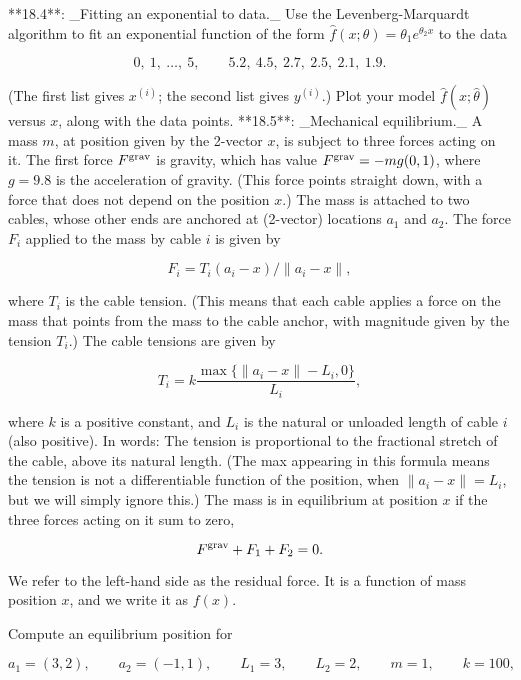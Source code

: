 

**18.4**: _Fitting an exponential to data._ Use the Levenberg-Marquardt algorithm to fit an exponential function of the form \(\hat{f}(x;\theta)=\theta_{1}e^{\theta_{2}x}\) to the data

\[0,\ 1,\ \ldots,\ 5,\qquad 5.2,\ 4.5,\ 2.7,\ 2.5,\ 2.1,\ 1.9.\]

(The first list gives \(x^{(i)}\); the second list gives \(y^{(i)}\).) Plot your model \(\hat{f}(x;\hat{\theta})\) versus \(x\), along with the data points.
**18.5**: _Mechanical equilibrium._ A mass \(m\), at position given by the 2-vector \(x\), is subject to three forces acting on it. The first force \(F^{\rm grav}\) is gravity, which has value \(F^{\rm grav}=-mg(0,1)\), where \(g=9.8\) is the acceleration of gravity. (This force points straight down, with a force that does not depend on the position \(x\).) The mass is attached to two cables, whose other ends are anchored at (2-vector) locations \(a_{1}\) and \(a_{2}\). The force \(F_{i}\) applied to the mass by cable \(i\) is given by

\[F_{i}=T_{i}(a_{i}-x)/\|a_{i}-x\|,\]

where \(T_{i}\) is the cable tension. (This means that each cable applies a force on the mass that points from the mass to the cable anchor, with magnitude given by the tension \(T_{i}\).) The cable tensions are given by

\[T_{i}=k\frac{\max\{\|a_{i}-x\|-L_{i},0\}}{L_{i}},\]

where \(k\) is a positive constant, and \(L_{i}\) is the natural or unloaded length of cable \(i\) (also positive). In words: The tension is proportional to the fractional stretch of the cable, above its natural length. (The max appearing in this formula means the tension is not a differentiable function of the position, when \(\|a_{i}-x\|=L_{i}\), but we will simply ignore this.) The mass is in equilibrium at position \(x\) if the three forces acting on it sum to zero,

\[F^{\rm grav}+F_{1}+F_{2}=0.\]

We refer to the left-hand side as the residual force. It is a function of mass position \(x\), and we write it as \(f(x)\).

Compute an equilibrium position for

\[a_{1}=(3,2),\qquad a_{2}=(-1,1),\qquad L_{1}=3,\qquad L_{2}=2,\qquad m=1, \qquad k=100,\]

